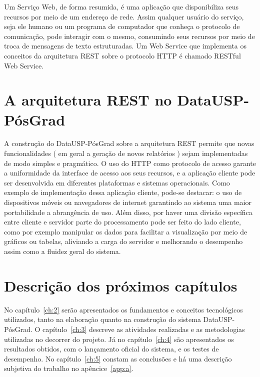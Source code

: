 \par
Um Serviço Web, de forma resumida, é uma aplicação que disponibiliza seus recursos por meio de um endereço de rede. Assim qualquer usuário do serviço, seja ele humano ou um programa de computador que conheça o protocolo de comunicação, pode interagir com o mesmo, consumindo seus recursos por meio de troca de mensagens de texto estruturadas. Um Web Service que implementa os conceitos da arquitetura REST sobre o protocolo HTTP é chamado RESTful Web Service.


\section{A arquitetura REST no DataUSP-PósGrad}

A construção do DataUSP-PósGrad sobre a arquitetura REST permite que novas funcionalidades ( em geral a geração de novos relatórios ) sejam implementadas de modo simples e pragmático. O uso do HTTP como protocolo de acesso garante a uniformidade da interface de acesso aos seus recursos, e a aplicação cliente pode ser desenvolvida em diferentes plataformas e sistemas operacionais. Como exemplo de implementação dessa aplicação cliente, pode-se destacar: o uso de  dispositivos móveis ou navegadores de internet garantindo ao sistema uma maior portabilidade a abrangência de uso. Além disso, por haver uma divisão específica entre cliente e servidor parte do processamento pode ser feito do lado cliente, como por exemplo manipular os dados para facilitar a visualização por meio de gráficos ou tabelas, aliviando a carga do servidor e melhorando o desempenho assim como a fluidez geral do sistema.


\section{Descrição dos próximos capítulos}

No capítulo~\ref{ch:2} serão apresentados os fundamentos e conceitos tecnológicos utilizados, tanto na elaboração quanto na construção do sistema DataUSP-PósGrad. O capítulo~\ref{ch:3} descreve as atividades realizadas e as metodologias utilizadas no decorrer do projeto. Já no capítulo~\ref{ch:4} são apresentados os resultados obtidos, com o lançamento oficial do sistema, e os testes de desempenho. No capítulo~\ref{ch:5} constam as conclusões e há uma descrição subjetiva do trabalho no apêncice~\ref{app:a}.   


